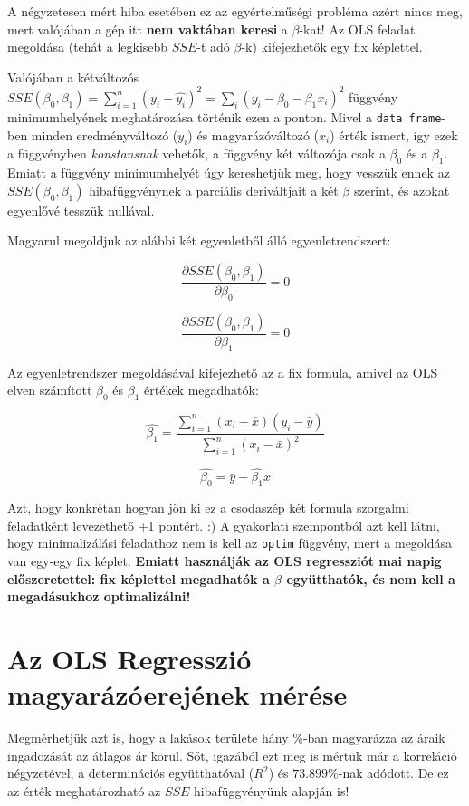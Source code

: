 \documentclass[
]{book}
\begin{document}
A négyzetesen mért hiba esetében ez az egyértelműségi probléma azért nincs meg, mert valójában a gép itt \textbf{nem vaktában keresi} a \(\beta\)-kat! Az OLS feladat megoldása (tehát a legkisebb \(SSE\)-t adó \(\beta\)-k) kifejezhetők egy fix képlettel.

Valójában a kétváltozós \(SSE(\beta_0,\beta_1)=\sum_{i=1}^n(y_i-\hat{y_i})^2=\sum_{i}(y_i-\beta_0-\beta_1x_i)^2\) függvény minimumhelyének meghatározása történik ezen a ponton. Mivel a \texttt{data\ frame}-ben minden eredményváltozó (\(y_i\)) és magyarázóváltozó (\(x_i\)) érték ismert, így ezek a függvényben \emph{konstansnak} vehetők, a függvény két változója csak a \(\beta_0\) és a \(\beta_1\). Emiatt a függvény minimumhelyét úgy kereshetjük meg, hogy vesszük ennek az \(SSE(\beta_0,\beta_1)\) hibafüggvénynek a parciális deriváltjait a két \(\beta\) szerint, és azokat egyenlővé tesszük nullával.

Magyarul megoldjuk az alábbi két egyenletből álló egyenletrendszert:

\[\frac{\partial SSE(\beta_0,\beta_1)}{\partial \beta_0}=0\]

\[\frac{\partial SSE(\beta_0,\beta_1)}{\partial \beta_1}=0\]

Az egyenletrendszer megoldásával kifejezhető az a fix formula, amivel az OLS elven számított \(\beta_0\) és \(\beta_1\) értékek megadhatók:

\[\hat{\beta_1}=\frac{\sum_{i=1}^n{(x_i-\bar{x})(y_i-\bar{y})}}{\sum_{i=1}^n{(x_i-\bar{x})^2}}\]

\[\hat{\beta_0}=\bar{y}-\hat{\beta_1}x\]

Azt, hogy konkrétan hogyan jön ki ez a csodaszép két formula szorgalmi feladatként levezethető +1 pontért. :)
A gyakorlati szempontból azt kell látni, hogy minimalizálási feladathoz nem is kell az \texttt{optim} függvény, mert a megoldása van egy-egy fix képlet. \textbf{Emiatt használják az OLS regressziót mai napig előszeretettel: fix képlettel megadhatók a \(\beta\) együtthatók, és nem kell a megadásukhoz optimalizálni!}

\section{Az OLS Regresszió magyarázóerejének mérése}\label{az-ols-regressziuxf3-magyaruxe1zuxf3erejuxe9nek-muxe9ruxe9se}

Megmérhetjük azt is, hogy a lakások területe hány \%-ban magyarázza az áraik ingadozását az átlagos ár körül. Sőt, igazából ezt meg is mértük már a korreláció négyzetével, a determinációs együtthatóval (\(R^2\)) és \(73.899\%\)-nak adódott. De ez az érték meghatározható az \(SSE\) hibafüggvényünk alapján is!
\end{document}
